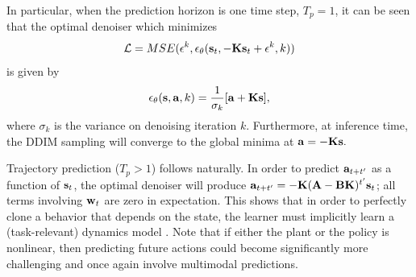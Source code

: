 \documentclass[Afour,sageh,times]{sagej}
\begin{document}
In particular, when the prediction horizon is one time step, $T_p=1$, it can be seen that the optimal denoiser which minimizes 
\begin{equation}
    \mathcal{L}=MSE(\mathbf{\epsilon}^k,\epsilon_\theta(\mathbf{s}_t, -{\bf K}{\bf s}_t + \mathbf{\epsilon}^k, k))
\end{equation}
is given by $$\epsilon_\theta({\bf s}, {\bf a}, k) = \frac{1}{\sigma_k}[{\bf a} + {\bf K}{\bf s}],$$ where $\sigma_k$ is the variance on denoising iteration $k$. Furthermore, at inference time, the DDIM sampling will converge to the global minima at ${\bf a} = -{\bf Ks}.$

Trajectory prediction ($T_p>1$) follows naturally. In order to predict ${\bf a}_{t+t'}$ as a function of ${\bf s}_t$, the optimal denoiser will produce ${\bf a}_{t+t'} = -{\bf K}({\bf A}-{\bf BK})^{t'}{\bf s}_t$; all terms involving ${\bf w}_t$ are zero in expectation. This shows that in order to perfectly clone a behavior that depends on the state, the learner must implicitly learn a (task-relevant) dynamics model \cite{subramanian2019approximate,zhang2020learning}. Note that if either the plant or the policy is nonlinear, then predicting future actions could become significantly more challenging and once again involve multimodal predictions.
\end{document}
